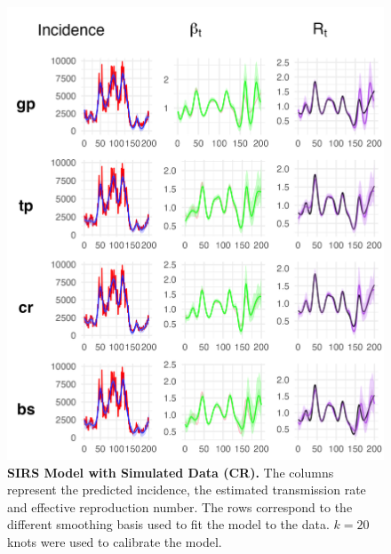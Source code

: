 \documentclass[
11pt, %
oneside, %
english, %
singlespacing, %
]{macthesis} %
\begin{document}
\begin{figure}[H]
\centering
\includegraphics[width=\textwidth]{figure/Simulated/unaggregated/sim_combined_cr.png}
\caption[SIRS model with simulated data (CR).]{\textbf{SIRS Model with Simulated Data (CR).} The columns represent the predicted incidence, the estimated transmission rate and effective reproduction number. The rows correspond to the different smoothing basis used to fit the model to the data. \(k=20\) knots were used to calibrate the model.}
\label{fig:sim_cr}
\end{figure}
\end{document}
